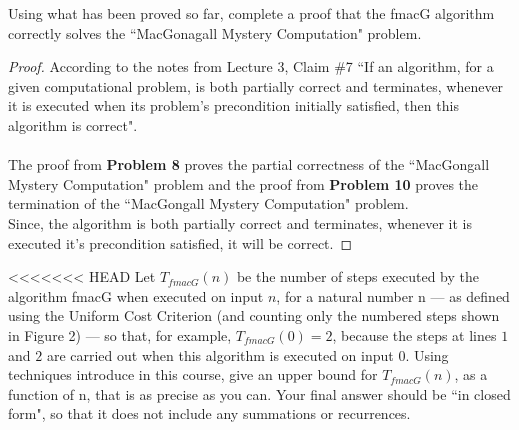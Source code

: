 \documentclass[12pt]{article}
\newenvironment{problem}[2][Problem]{\begin{trivlist}
\item[\hskip \labelsep {\bfseries #1}\hskip \labelsep {\bfseries #2.}]}{\end{trivlist}}
\begin{document}

\begin{problem}{11}
Using what has been proved so far, complete a proof that the fmacG algorithm correctly
solves the “MacGonagall Mystery Computation" problem.

\end{problem}

\begin{proof}
According to the notes from Lecture 3, Claim \#7 ``If an algorithm, for a given computational problem, is
both partially correct and terminates, whenever it is executed when its problem’s precondition initially satisfied, then this algorithm is correct".
\\ 
\\
The proof from \textbf{Problem 8} proves the partial correctness of the ``MacGongall Mystery Computation" problem and the proof from \textbf{Problem 10} proves the termination of the ``MacGongall Mystery Computation" problem.
\\
Since, the algorithm is both partially correct and terminates, whenever it is executed it's precondition satisfied, it will be correct. 

\end{proof}



\begin{problem}{12}
<<<<<<< HEAD
Let $T_{fmacG}(n)$ be the number of steps executed by the algorithm fmacG when executed
on input $n$, for a natural number n — as defined using the Uniform Cost Criterion (and
counting only the numbered steps shown in Figure 2) — so that, for example, $T_{fmacG}(0) = 2$, because the steps at lines $1$ and $2$ are carried out when this algorithm is executed on input 0. Using techniques introduce in this course, give an upper bound for $T_{fmacG}(n)$, as a function of n, that is as precise as you can. Your final answer should be ``in closed form", so that it does not include any summations or recurrences.
\end{problem}
\end{document}
